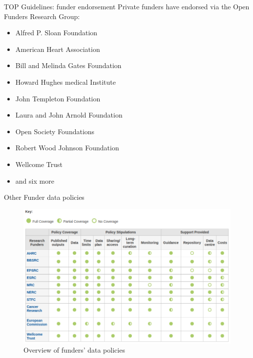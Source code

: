 \documentclass[aspectratio=169, 11pt]{beamer} %
\begin{document}
\begin{frame}{TOP Guidelines: funder endorsement}
  Private funders have endorsed via the Open Funders Research Group:
    \begin{itemize}[label=\textbullet]
        \item Alfred P. Sloan Foundation
        \item American Heart Association
        \item Bill and Melinda Gates Foundation
        \item Howard Hughes medical Institute
        \item John Templeton Foundation
        \item Laura and John Arnold Foundation
        \item Open Society Foundations
        \item Robert Wood Johnson Foundation
        \item Wellcome Trust
        \item and six more \cite{Ofrg2019-pq}
    \end{itemize}
\end{frame}

\begin{frame}{Other Funder data policies}
  \begin{figure}[H]
    \centering
        \includegraphics[height=.7\textheight]{figures/DCC-Funders.png}
        \caption{Overview of funders' data policies \cite{Dcc2019-jn}}
        \label{fig:Dcc2018}
  \end{figure}
\end{frame}
\end{document}
